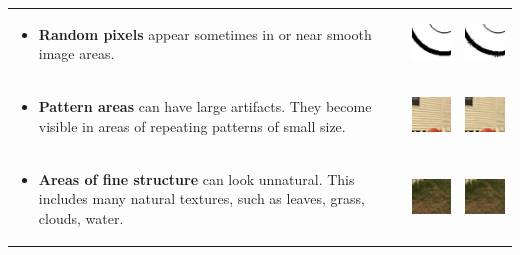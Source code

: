 \documentclass[]{usiinfbachelorproject}
\begin{document}
\begin{tabular}{m{} m{2.2cm} m{2cm}}
	\begin{itemize}
		\item {\bf Random pixels} appear sometimes in or near smooth image areas.
	\end{itemize}
	&
	\includegraphics[scale=0.8]{img/random1.jpeg}
	&
	\includegraphics[scale=0.8]{img/random2.jpeg}
	\\
	\begin{itemize}
		\item {\bf Pattern areas} can have large artifacts. They become visible in areas of repeating patterns of small size.
	\end{itemize}
	&
	\includegraphics[scale=0.8]{img/pattern1.jpeg}
	&
	\includegraphics[scale=0.8]{img/pattern2.jpeg}
	\\
	\begin{itemize}
		\item {\bf Areas of fine structure} can look unnatural. This includes many natural textures, such as leaves, grass, clouds, water.
	\end{itemize}
	&
	\includegraphics[scale=0.8]{img/grass1.jpeg}
	&
	\includegraphics[scale=0.8]{img/grass2.jpeg}
\end{tabular}\\\\
\end{document}
